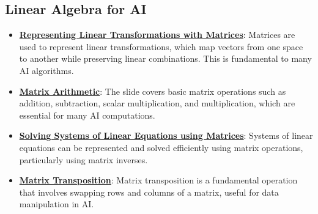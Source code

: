 \documentclass{article}%
\begin{document}
\subsection{Linear Algebra for AI}%
\label{subsec:LinearAlgebraforAI}%
\begin{itemize}[leftmargin=*]%
\item \href{https://purdue.brightspace.com/d2l/common/assets/pdfjs-d2l-dist/1.0.14-legacy/web/viewer.html?file=\%2Fcontent\%2Fenforced\%2F1095467-wl.202510.CS.24300.001\%2F04L1-Linear Algebra Primer.pdf\%3Fou\%3D1095467\&lang=en-us\&container=d2l-fileviewer-rendered-pdf\&fullscreen=d2l-fileviewer-rendered-pdf-dialog\&height=667#page=5}{\textbf{Representing Linear Transformations with Matrices}}: Matrices are used to represent linear transformations, which map vectors from one space to another while preserving linear combinations. This is fundamental to many AI algorithms.%
\item \href{https://purdue.brightspace.com/d2l/common/assets/pdfjs-d2l-dist/1.0.14-legacy/web/viewer.html?file=\%2Fcontent\%2Fenforced\%2F1095467-wl.202510.CS.24300.001\%2F04L1-Linear Algebra Primer.pdf\%3Fou\%3D1095467\&lang=en-us\&container=d2l-fileviewer-rendered-pdf\&fullscreen=d2l-fileviewer-rendered-pdf-dialog\&height=667#page=9}{\textbf{Matrix Arithmetic}}: The slide covers basic matrix operations such as addition, subtraction, scalar multiplication, and multiplication, which are essential for many AI computations.%
\item \href{https://purdue.brightspace.com/d2l/common/assets/pdfjs-d2l-dist/1.0.14-legacy/web/viewer.html?file=\%2Fcontent\%2Fenforced\%2F1095467-wl.202510.CS.24300.001\%2F04L1-Linear Algebra Primer.pdf\%3Fou\%3D1095467\&lang=en-us\&container=d2l-fileviewer-rendered-pdf\&fullscreen=d2l-fileviewer-rendered-pdf-dialog\&height=667#page=11}{\textbf{Solving Systems of Linear Equations using Matrices}}: Systems of linear equations can be represented and solved efficiently using matrix operations, particularly using matrix inverses.%
\item \href{https://purdue.brightspace.com/d2l/common/assets/pdfjs-d2l-dist/1.0.14-legacy/web/viewer.html?file=\%2Fcontent\%2Fenforced\%2F1095467-wl.202510.CS.24300.001\%2F04L1-Linear Algebra Primer.pdf\%3Fou\%3D1095467\&lang=en-us\&container=d2l-fileviewer-rendered-pdf\&fullscreen=d2l-fileviewer-rendered-pdf-dialog\&height=667#page=16}{\textbf{Matrix Transposition}}: Matrix transposition is a fundamental operation that involves swapping rows and columns of a matrix, useful for data manipulation in AI.%

\end{itemize}
\end{document}

